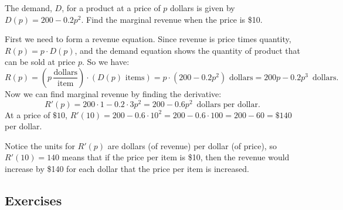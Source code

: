 \begin{example}
The demand, $D$, for a product at a price of $p$ dollars is given by $D(p)=200-0.2p^2$. Find the marginal revenue when the price is \$10.

\begin{solution} First we need to form a revenue equation. Since revenue is price times quantity, $R(p) = p\cdot D(p)$, and the demand equation shows the quantity of product that can be sold at price $p$. So we have:
$$R(p)=\left(p\, \frac{\mbox{dollars}}{\mbox{item}}\right) \cdot (D(p) \mbox{ items}) = p\cdot (200-0.2p^2) \mbox{ dollars} = 200p-0.2p^3 \enspace \mbox{dollars}.$$
Now we can find marginal revenue by finding the derivative:
$$R'(p)=200\cdot 1 - 0.2\cdot 3p^2 = 200-0.6p^2 \enspace \mbox{dollars per dollar}.$$
At a price of $\$10$, $R'(10)=200-0.6\cdot 10^2 = 200-0.6\cdot 100 = 200 - 60 = \$140$ per dollar.

Notice the units for $R'(p)$ are dollars (of revenue) per dollar (of price), so $R'(10)=140$ means that if the price per item is \$10, then the revenue would increase by \$140 for each dollar that the price per item is increased.
\end{solution}\end{example}

\subsection{Exercises}


